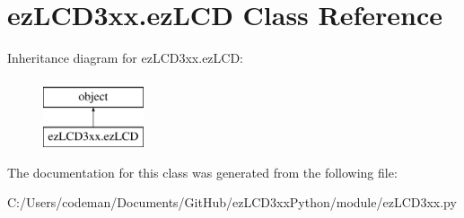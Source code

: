 \hypertarget{classez_l_c_d3xx_1_1ez_l_c_d}{\section{ez\-L\-C\-D3xx.\-ez\-L\-C\-D Class Reference}
\label{classez_l_c_d3xx_1_1ez_l_c_d}
}
Inheritance diagram for ez\-L\-C\-D3xx.\-ez\-L\-C\-D\-:\begin{figure}[H]
\begin{center}
\leavevmode
\includegraphics[height=2.000000cm]{d0/dc0/classez_l_c_d3xx_1_1ez_l_c_d}
\end{center}
\end{figure}


The documentation for this class was generated from the following file\-:\begin{DoxyCompactItemize}
\item 
C\-:/\-Users/codeman/\-Documents/\-Git\-Hub/ez\-L\-C\-D3xx\-Python/module/ez\-L\-C\-D3xx.\-py\end{DoxyCompactItemize}
